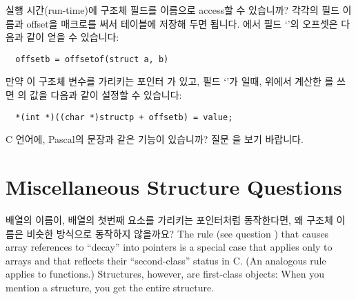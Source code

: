 \begin{faq}
	실행 시간(run-time)에 구조체 필드를 이름으로 access할 수 있습니까?
\A 
	각각의 필드 이름과 offset을  매크로를 써서 테이블에
	저장해 두면 됩니다.  에서 필드 `'의 오프셋은 다음과
	같이 얻을 수 있습니다:

\begin{verbatim}
  offsetb = offsetof(struct a, b)
\end{verbatim}

	만약 이 구조체 변수를 가리키는 포인터 가 있고,
	필드 `'가 일때, 위에서 계산한 를
	쓰면 의 값을 다음과 같이 설정할 수 있습니다:

\begin{verbatim}
  *(int *)((char *)structp + offsetb) = value;
\end{verbatim}
\end{faq}

\begin{faq}
        C 언어에, Pascal의  문장과 같은 기능이 있습니까?
\A
        질문 을 보기 바랍니다.
\end{faq}

\section{Miscellaneous Structure Questions}

\begin{faq}
        배열의 이름이, 배열의 첫번째 요소를 가리키는 포인터처럼 동작한다면, 
        왜 구조체 이름은 비슷한 방식으로 동작하지 않을까요?
\A
        The rule (see question ) that causes array references to
        ``decay'' into pointers is a special case that applies only to
        arrays and that reflects their ``second-class'' status in C.
        (An analogous rule applies to functions.) Structures, however,
        are first-class objects: When you mention a structure, you get the
        entire structure.
\end{faq}

